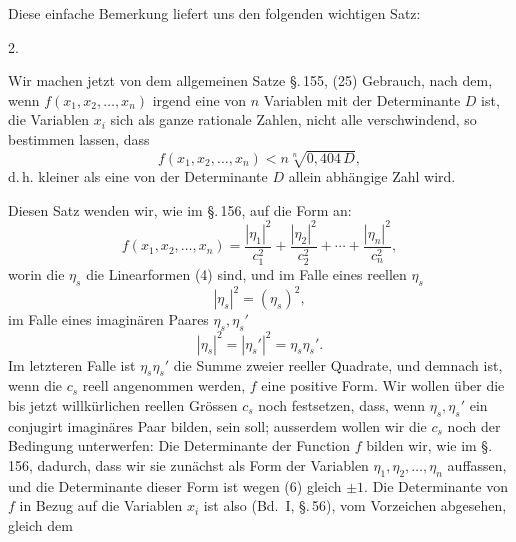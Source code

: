 Diese einfache Bemerkung liefert uns den folgenden wichtigen Satz:

2. 

Wir machen jetzt von dem allgemeinen Satze \S.\,155, (25) Gebrauch, nach dem, wenn $f(x_1,x_2,\dots,x_n)$ irgend eine  von $n$ Variablen mit der Determinante $D$ ist, die Variablen $x_i$ sich als ganze rationale Zahlen, nicht alle verschwindend, so bestimmen lassen, dass
\[
f(x_1,x_2,\dots,x_n) < n\sqrt[n]{0{,}404\,D},
\]
d.\,h. kleiner als eine von der Determinante $D$ allein abh\"angige Zahl wird.

Diesen Satz wenden wir, wie im \S.\,156, auf die Form an:
\[
f(x_1,x_2,\dots,x_n) = \frac{|\eta_1|^2}{c_1^2} + \frac{|\eta_2|^2}{c_2^2} + \cdots + \frac{|\eta_n|^2}{c_n^2},
\]
worin die $\eta_s$ die Linearformen (4) sind, und im Falle eines reellen $\eta_s$
\[
|\eta_s|^2 = (\eta_s)^2,
\]
im Falle eines imagin\"aren Paares $\eta_s, \eta_s'$
\[
|\eta_s|^2 = |\eta_s'|^2 = \eta_s\eta_s'.
\]
Im letzteren Falle ist $\eta_s\eta_s'$ die Summe zweier reeller Quadrate, und demnach ist, wenn die $c_s$ reell angenommen werden, $f$ eine positive Form. Wir wollen \"uber die bis jetzt willk\"urlichen reellen Gr\"ossen $c_s$ noch festsetzen, dass, wenn $\eta_s, \eta_s'$ ein conjugirt imagin\"ares Paar bilden,
sein soll; ausserdem wollen wir die $c_s$ noch der Bedingung unterwerfen:
Die Determinante der Function $f$ bilden wir, wie im \S.\,156, dadurch, dass wir sie zun\"achst als Form der Variablen $\eta_1, \eta_2, \dots, \eta_n$ auffassen, und die Determinante dieser Form ist wegen (6) gleich $\pm 1$. Die Determinante von $f$ in Bezug auf die Variablen $x_i$ ist also (Bd.\ I, \S.\,56), vom Vorzeichen abgesehen, gleich dem
